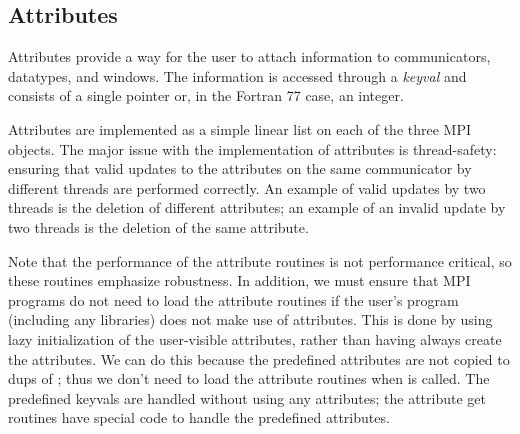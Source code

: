 \documentclass{article}
\begin{document}


\subsection{Attributes}
\label{sec:attr}

Attributes provide a way for the user to attach information to
communicators, datatypes, and windows.  The information is accessed
through a \emph{keyval} and consists of a single pointer or, in the
Fortran 77 case, an integer.

Attributes are implemented as a simple linear list on each of the
three MPI objects.  The major issue with the implementation of attributes
is thread-safety: ensuring that valid updates to the attributes on the
same communicator by different threads are performed correctly.  An
example of valid updates by two threads is the deletion of different
attributes; an example of an invalid update by two threads is the
deletion of the same attribute.


Note that the performance of the attribute routines is not performance
critical, so these routines emphasize robustness.  In addition, we
must ensure that MPI programs do not need to load the
attribute routines if the user's program (including any libraries)
does not make use of attributes.  This is done by using lazy
initialization of the user-visible attributes, rather than having
 always create the attributes.  
We can do this because
the predefined attributes are not copied to dups of
; thus we don't need to load the attribute
routines when  is called.
The predefined keyvals are handled without using any attributes; the
attribute get routines have special code to handle the predefined attributes.
\end{document}
